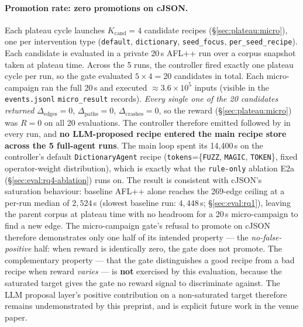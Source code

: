 \documentclass[11pt]{article}
\begin{document}
\paragraph{Promotion rate: zero promotions on cJSON.}
Each plateau cycle launches $K_{\text{cand}}{=}4$ candidate recipes
(\S\ref{sec:plateau:micro}), one per intervention type
(\texttt{default}, \texttt{dictionary}, \texttt{seed\_focus},
\texttt{per\_seed\_recipe}). Each candidate is evaluated in a
private 20\,s AFL++ run over a corpus snapshot taken at plateau
time. Across the 5 runs, the controller fired exactly one plateau
cycle per run, so the gate evaluated $5 \times 4 = 20$ candidates in
total. Each micro-campaign ran the full 20\,s and executed
${\approx}3.6 \times 10^{5}$ inputs (visible in the
\texttt{events.jsonl} \texttt{micro\_result} records). \emph{Every
single one of the 20 candidates returned}
$\Delta_{\text{edges}}{=}0$,
$\Delta_{\text{paths}}{=}0$,
$\Delta_{\text{crashes}}{=}0$, so the reward (\S\ref{sec:plateau:micro})
was $R{=}0$ on all 20 evaluations. The controller therefore emitted
 followed by
in every run, and \textbf{no LLM-proposed recipe entered the main
recipe store across the 5 full-agent runs}. The main loop spent its
14{,}400\,s on the controller's default \texttt{DictionaryAgent}
recipe (\texttt{tokens}=\{\texttt{FUZZ}, \texttt{MAGIC},
\texttt{TOKEN}\}, fixed operator-weight distribution), which is
exactly what the \texttt{rule-only} ablation E2a (\S\ref{sec:eval:rq4-ablation})
runs on. The result is consistent with cJSON's saturation behaviour:
baseline AFL++ alone reaches the 269-edge ceiling at a per-run
median of $2{,}524$\,s (slowest baseline run: $4{,}448$\,s;
\S\ref{sec:eval:rq1}), leaving the parent
corpus at plateau time with no headroom for a 20\,s micro-campaign
to find a new edge. The micro-campaign gate's refusal to promote
on cJSON therefore demonstrates only one half of its intended
property --- the \emph{no-false-positive} half: when reward is
identically zero, the gate does not promote. The complementary
property --- that the gate distinguishes a good recipe from a bad
recipe when reward \emph{varies} --- is \textbf{not} exercised by
this evaluation, because the saturated target gives the gate no
reward signal to discriminate against. The LLM proposal layer's
positive contribution on a non-saturated target therefore remains
undemonstrated by this preprint, and is explicit future work in
the venue paper.
\end{document}
